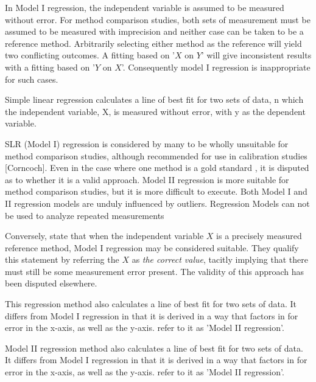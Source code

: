 \documentclass[12pt, a4paper]{report}
\theoremstyle{plain}
\theoremstyle{definition}
\theoremstyle{remark}
\begin{document}
In Model I regression, the independent variable is assumed to be
measured without error. For method comparison studies, both sets of measurement must be assumed to be measured with imprecision and neither case can be taken to be a reference method. Arbitrarily
selecting either method as the reference will yield two conflicting outcomes. A fitting based on '$X$ on $Y$' will give inconsistent results with a fitting based on '$Y$ on $X$'. Consequently model I regression is inappropriate for such cases.



 
Simple linear regression calculates a line of best fit for two
sets of data, n which the independent variable, X, is measured without error, with y as the dependent variable.  

SLR (Model I) regression is considered by many \citet{BA83,CornCoch,ludbrook97} to be wholly unsuitable for
method comparison studies, although recommended for use in calibration studies [Corncoch]. Even in the case where one
method is a gold standard , it is disputed as to whether it is a valid approach. Model II regression is more suitable for method comparison studies, but it is more difficult to execute. Both Model I and II regression models are unduly influenced by outliers. Regression Models can not be used to analyze repeated measurements


Conversely, \citet{CornCoch} state that when the independent
variable $X$ is a precisely measured reference method, Model I
regression may be considered suitable. They qualify this statement
by referring the $X$ as \emph{the correct value}, tacitly
implying that there must still be some measurement error present.
The validity of this approach has been disputed elsewhere.

This regression method also calculates a line of best fit for two sets of data. It differs from Model I regression in that it is derived in a way that factors in for error in the x-axis, as well as the y-axis. \citet{CornCoch} refer to it as 'Model II regression'.

Model II regression method also calculates a line of best fit for two sets of data. It differs from Model I regression in that it is derived in a way that factors in for error in the x-axis, as well as the y-axis. \citet{CornCoch} refer to it as 'Model II regression'.
\end{document}

